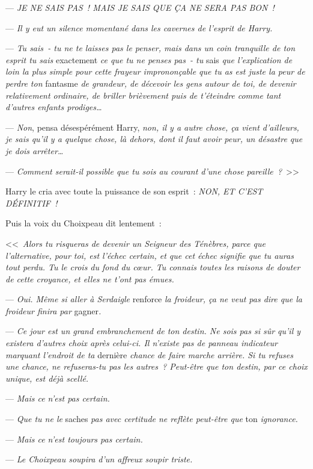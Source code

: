 --- \emph{JE NE SAIS PAS~! MAIS JE SAIS QUE ÇA NE SERA PAS BON~!}

--- \emph{Il y eut un silence momentané dans les cavernes de l'esprit de Harry.}

--- \emph{Tu sais~- tu ne te laisses pas le penser, mais dans un coin tranquille de ton esprit tu sais} exactement \emph{ce que tu ne penses pas~- tu} sais \emph{que l'explication de loin la plus simple pour cette frayeur imprononçable que tu as est juste la peur de perdre ton} fantasme \emph{de grandeur, de décevoir les gens autour de toi, de devenir relativement ordinaire, de briller brièvement puis de t'éteindre comme tant d'autres enfants prodiges…}

--- \emph{Non}, pensa désespérément Harry, \emph{non, il y a autre chose, ça vient d'ailleurs, je sais qu'il y a quelque chose, là dehors, dont il faut avoir peur, un désastre que je dois arrêter…}

--- \emph{Comment serait-il possible que tu sois au courant d'une chose pareille~?}~>>

Harry le cria avec toute la puissance de son esprit~: \emph{NON, ET C'EST DÉFINITIF~!}

Puis la voix du Choixpeau dit lentement~:

<<~\emph{Alors tu risqueras de devenir un Seigneur des Ténèbres, parce que l'alternative, pour toi, est l'échec certain, et que cet échec signifie que tu auras tout perdu. Tu le crois du fond du cœur. Tu connais toutes les raisons de douter de cette croyance, et elles ne t'ont pas émues.}

--- \emph{Oui. Même si aller à Serdaigle} renforce \emph{la froideur, ça ne veut pas dire que la froideur finira par} gagner\emph{.}

--- \emph{Ce jour est un grand embranchement de ton destin. Ne sois pas si sûr qu'il y existera d'autres choix après celui-ci. Il n'existe pas de panneau indicateur marquant l'endroit de ta} dernière \emph{chance de faire marche arrière. Si tu refuses une chance, ne refuseras-tu pas les autres~? Peut-être que ton destin, par ce choix unique, est déjà scellé.}

--- \emph{Mais ce n'est pas certain.}

--- \emph{Que tu ne le} saches \emph{pas avec certitude ne reflète peut-être que} ton \emph{ignorance.}

--- \emph{Mais ce n'est toujours pas certain.}

--- \emph{Le Choixpeau soupira d'un affreux soupir triste.}

